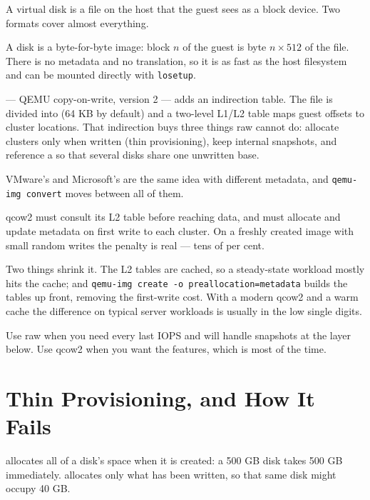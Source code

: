 A virtual disk is a file on the host that the guest sees as a block device.
Two formats cover almost everything.

\begin{definitionbox}
A  disk is a byte-for-byte image: block $n$ of the guest is byte
$n \times 512$ of the file. There is no metadata and no translation, so it is
as fast as the host filesystem and can be mounted directly with
\texttt{losetup}.

\smallskip
{} --- QEMU copy-on-write, version 2 --- adds an indirection table.
The file is divided into  (64 KB by default) and a two-level
L1/L2 table maps guest offsets to cluster locations. That indirection buys
three things raw cannot do: allocate clusters only when written (thin
provisioning), keep internal snapshots, and reference a  so
that several disks share one unwritten base.

\smallskip
VMware's  and Microsoft's  are the same idea with
different metadata, and \texttt{qemu-img convert} moves between all of them.
\end{definitionbox}

\begin{alertbox}
qcow2 must consult its L2 table before reaching data, and must allocate and
update metadata on first write to each cluster. On a freshly created image with
small random writes the penalty is real --- tens of per cent.

\smallskip
Two things shrink it. The L2 tables are cached, so a steady-state workload
mostly hits the cache; and \texttt{qemu-img create -o preallocation=metadata}
builds the tables up front, removing the first-write cost. With a modern qcow2
and a warm cache the difference on typical server workloads is usually in the
low single digits.

\smallskip
Use raw when you need every last IOPS and will handle snapshots at the layer
below. Use qcow2 when you want the features, which is most of the time.
\end{alertbox}

\section{Thin Provisioning, and How It Fails}

 allocates all of a disk's space when it is created: a
500 GB disk takes 500 GB immediately.  allocates only
what has been written, so that same disk might occupy 40 GB.

